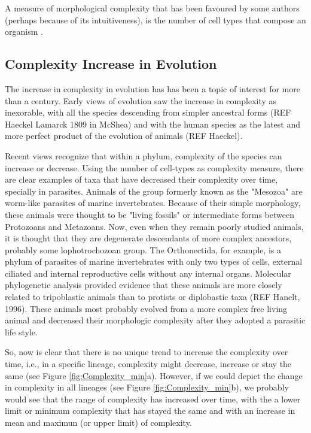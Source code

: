 
A measure of morphological complexity that has been favoured by some authors (perhaps because of its intuitiveness), is the number of cell types that compose an organism 
	\citep{Bell1997,Bonner2004,McShea1996}.


\subsection{Complexity Increase in Evolution}

The increase in complexity in evolution has has been a topic of interest for more than a century.
Early views of evolution saw the increase in complexity as inexorable, with all the species descending from simpler ancestral forms (REF Haeckel Lamarck 1809 in McShea) and with the human species as the latest and more perfect product of the evolution of animals (REF Haeckel).


Recent views recognize that within a phylum, complexity of the species can increase or decrease.
Using the number of cell-types as complexity measure, there are clear examples of taxa that have decreased their complexity over time, specially in parasites.
Animals of the group formerly known as the "Mesozoa" are worm-like parasites of marine invertebrates.
Because of their simple morphology, these animals were thought to be "living fossils" or intermediate forms between Protozoans and Metazoans.
Now, even when they remain poorly studied animals, it is thought that they are degenerate descendants of more complex ancestors, probably some lophotrochozoan group\citep{Arthur2010}.
The Orthonectida, for example, is a phylum of parasites of marine invertebrates with only two types of cells, external ciliated and internal reproductive cells without any internal organs. 
Molecular phylogenetic analysis provided evidence that these animals are more closely related to tripoblastic animals than to protists or diplobastic taxa (REF Hanelt, 1996).
These animals most probably evolved from a more complex free living animal and decreased their morphologic complexity after they adopted a parasitic life style.

So, now is clear that there is no unique trend to increase the complexity over time, i.e., in a specific lineage, complexity might decrease, increase or stay the same (see Figure \ref{fig:Complexity_min}a).
However, if we could depict the change in complexity in all lineages (see Figure \ref{fig:Complexity_min}b), we probably would see that the range of complexity has increased over time, with the a lower limit or minimum complexity that has stayed the same and with an increase in mean and maximun (or upper limit) of complexity\citep{McShea1996,Arthur2010}.

